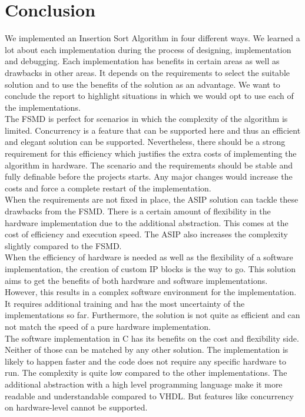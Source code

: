 \documentclass[conference]{IEEEtran}
\begin{document}
\section{Conclusion}
We implemented an Insertion Sort Algorithm in four different ways. We learned a lot about each implementation during the process of designing, implementation and debugging. Each implementation has benefits in certain areas as well as drawbacks in other areas. It depends on the requirements to select the suitable solution and to use the benefits of the solution as an advantage. We want to conclude the report to highlight situations in which we would opt to use each of the implementations. \\
The FSMD is perfect for scenarios in which the complexity of the algorithm is limited. Concurrency is a feature that can be supported here and thus an efficient and elegant solution can be supported. Nevertheless, there should be a strong requirement for this efficiency which justifies the extra costs of implementing the algorithm in hardware. The scenario and the requirements should be stable and fully definable before the projects starts. Any major changes would increase the costs and force a complete restart of the implementation. \\
When the requirements are not fixed in place, the ASIP solution can tackle these drawbacks from the FSMD. There is a certain amount of flexibility in the hardware implementation due to the additional abstraction. This comes at the cost of efficiency and execution speed. The ASIP also increases the complexity slightly compared to the FSMD. \\
When the efficiency of hardware is needed as well as the flexibility of a software implementation, the creation of custom IP blocks is the way to go. This solution aims to get the benefits of both hardware and software implementations. However, this results in a complex software environment for the implementation. It requires additional training and has the most uncertainty of the implementations so far. Furthermore, the solution is not quite as efficient and can not match the speed of a pure hardware implementation.\\
The software implementation in C has its benefits on the cost and flexibility side. Neither of those can be matched by any other solution. The implementation is likely to happen faster and the code does not require any specific hardware to run. The complexity is quite low compared to the other implementations. The additional abstraction with a high level programming language make it more readable and understandable compared to VHDL. But features like concurrency on hardware-level cannot be supported.\\
\end{document}
